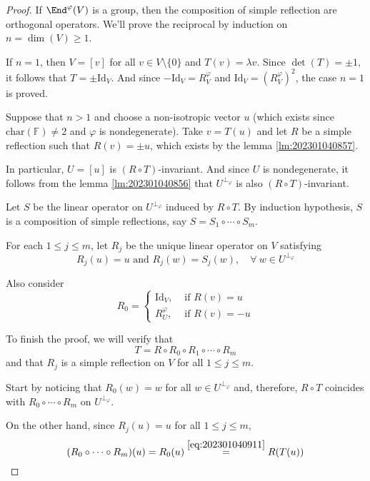 \begin{proof}
  If $\End^\varphi(V)$ is a group, then the composition of simple reflection are orthogonal operators. We'll prove the reciprocal by induction on $n = \dim(V) \geq 1$.

  If $n = 1$, then $V = [v]$ for all $v \in V \setminus \{ 0 \}$ and $T(v) = \lambda v$. Since $\det(T) = \pm 1$, it follows that $T = \pm \text{Id}_V$. And since $- \text{Id}_V = R_V^\varphi$ and $\text{Id}_V = (R_V^\varphi)^2$, the case $n = 1$ is proved. 

  Suppose that $n > 1$ and choose a non-isotropic vector $u$ (which exists since $\text{char}(\mathbb{F}) \neq 2$ and $\varphi$ is nondegenerate). Take $v = T(u)$ and let $R$ be a simple reflection such that $R(v) = \pm u$, which exists by the lemma \ref{lm:202301040857}.
  
  In particular, $U = [u]$ is $(R \circ T)$-invariant. And since $U$ is nondegenerate, it follows from the lemma \ref{lm:202301040856} that $U^{\perp_\varphi}$ is also $(R \circ T)$-invariant.

  Let $S$ be the linear operator on $U^{\perp_\varphi}$ induced by $R \circ T$. By induction hypothesis, $S$ is a composition of simple reflections, say $S = S_1 \circ \cdots \circ S_m$.

  For each $1 \leq j \leq m$, let $R_j$ be the unique linear operator on $V$ satisfying 
  \[
    R_j(u) = u \text{ and } R_j(w) = S_j(w), \quad \forall ~w \in U^{\perp_\varphi}
  \]

  Also consider 
  \begin{equation}\label{eq:202301040911}
    R_0 = \begin{cases}
      \text{Id}_V, & \text{ if } R(v) = u \\
      R_U^\varphi, & \text{ if } R(v) = -u
    \end{cases}
  \end{equation}

  To finish the proof, we will verify that 
  \begin{equation}\label{eq:202301040913}
    T = R \circ R_0 \circ R_1 \circ \cdots \circ R_m
  \end{equation}
  and that $R_j$ is a simple reflection on $V$ for all $1 \leq j \leq m$.

  Start by noticing that $R_0(w) = w$ for all $w \in U^{\perp_\varphi}$ and, therefore, $R \circ T$ coincides with $R_0 \circ \cdots \circ R_m$ on $U^{\perp_\varphi}$. 

  On the other hand, since $R_j(u) = u$ for all $1 \leq j \leq m$, 
  \[
    (R_0 \circ \cdots \circ R_m)(u) = R_0(u) \overset{\ref{eq:202301040911}}{=} R(T(u))
  \]


\end{proof}
